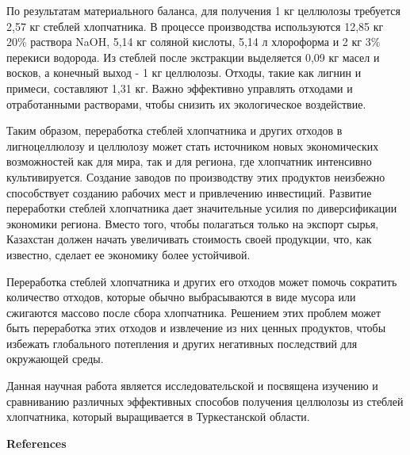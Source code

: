 \begin{multicols}{2}
По результатам материального баланса, для получения 1 кг целлюлозы
требуется 2,57 кг стеблей хлопчатника. В процессе производства
используются 12,85 кг 20\% раствора NaOH, 5,14 кг соляной кислоты, 5,14
л хлороформа и 2 кг 3\% перекиси водорода. Из стеблей после экстракции
выделяется 0,09 кг масел и восков, а конечный выход - 1 кг целлюлозы.
Отходы, такие как лигнин и примеси, составляют 1,31 кг. Важно эффективно
управлять отходами и отработанными растворами, чтобы снизить их
экологическое воздействие.

Таким образом, переработка стеблей хлопчатника и других отходов в
лигноцеллюлозу и целлюлозу может стать источником новых экономических
возможностей как для мира, так и для региона, где хлопчатник интенсивно
культивируется. Создание заводов по производству этих продуктов
неизбежно способствует созданию рабочих мест и привлечению инвестиций.
Развитие переработки стеблей хлопчатника дает значительные усилия по
диверсификации экономики региона. Вместо того, чтобы полагаться только
на экспорт сырья, Казахстан должен начать увеличивать стоимость своей
продукции, что, как известно, сделает ее экономику более устойчивой.

Переработка стеблей хлопчатника и других его отходов может помочь
сократить количество отходов, которые обычно выбрасываются в виде мусора
или сжигаются массово после сбора хлопчатника. Решением этих проблем
может быть переработка этих отходов и извлечение из них ценных
продуктов, чтобы избежать глобального потепления и других негативных
последствий для окружающей среды.

Данная научная работа является исследовательской и посвящена изучению и
сравниванию различных эффективных способов получения целлюлозы из
стеблей хлопчатника, который выращивается в Туркестанской области.
\end{multicols}

\begin{center}
{\bfseries References}
\end{center}

